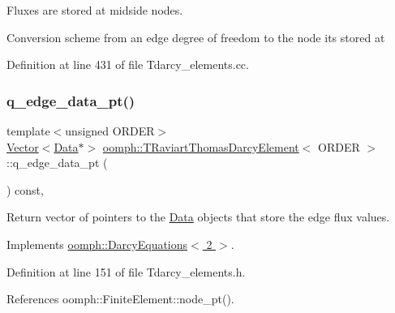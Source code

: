 Fluxes are stored at midside nodes. 

Conversion scheme from an edge degree of freedom to the node it\textquotesingle{}s stored at 

Definition at line 431 of file Tdarcy\+\_\+elements.\+cc.

\mbox{\label{classoomph_1_1TRaviartThomasDarcyElement_ac58734e7ac988c4eabc80f3352d613a6}} 
\subsubsection{\texorpdfstring{q\+\_\+edge\+\_\+data\+\_\+pt()}{q\_edge\_data\_pt()}}
{\footnotesize\ttfamily template$<$unsigned O\+R\+D\+ER$>$ \\
\hyperlink{classoomph_1_1Vector}{Vector}$<$\hyperlink{classoomph_1_1Data}{Data}$\ast$$>$ \hyperlink{classoomph_1_1TRaviartThomasDarcyElement}{oomph\+::\+T\+Raviart\+Thomas\+Darcy\+Element}$<$ O\+R\+D\+ER $>$\+::q\+\_\+edge\+\_\+data\+\_\+pt (\begin{DoxyParamCaption}{ }\end{DoxyParamCaption}) const\hspace{0.3cm}{\ttfamily [inline]}, {\ttfamily [virtual]}}



Return vector of pointers to the \hyperlink{classoomph_1_1Data}{Data} objects that store the edge flux values. 



Implements \hyperlink{classoomph_1_1DarcyEquations_acc843eea2fff3da96cd213afbff0f6e3}{oomph\+::\+Darcy\+Equations$<$ 2 $>$}.



Definition at line 151 of file Tdarcy\+\_\+elements.\+h.



References oomph\+::\+Finite\+Element\+::node\+\_\+pt().

\mbox{\label{classoomph_1_1TRaviartThomasDarcyElement_a5c0de6706bca0a9b006832dd8df30b81}} 
